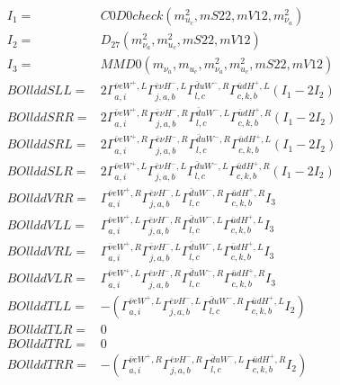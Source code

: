 \documentclass[A4,landscape]{article}
\begin{document}
\begin{align} 
I_1 = & C0D0check(m^2_{u_{{c}}}, mS22, mV12, m^2_{\nu_{{a}}}) \\ 
I_2 = & D_{27}(m^2_{\nu_{{a}}}, m^2_{u_{{c}}}, mS22, mV12) \\ 
I_3 = & MMD0(m_{\nu_{{a}}}, m_{u_{{c}}}, m^2_{\nu_{{a}}}, m^2_{u_{{c}}}, mS22, mV12) \\ 
  BOllddSLL= & 2  \Gamma^{\bar{\nu}e W^+,L}_{a, i} \Gamma^{\bar{e}\nu H^- ,L}_{j, a, b} \Gamma^{\bar{d}u W^- ,R}_{l, c} \Gamma^{\bar{u}d H^+,L}_{c, k, b} (I_1 - 2 I_2) \\ 
  BOllddSRR= & 2  \Gamma^{\bar{\nu}e W^+,R}_{a, i} \Gamma^{\bar{e}\nu H^- ,R}_{j, a, b} \Gamma^{\bar{d}u W^- ,L}_{l, c} \Gamma^{\bar{u}d H^+,R}_{c, k, b} (I_1 - 2 I_2) \\ 
  BOllddSRL= & 2  \Gamma^{\bar{\nu}e W^+,R}_{a, i} \Gamma^{\bar{e}\nu H^- ,R}_{j, a, b} \Gamma^{\bar{d}u W^- ,R}_{l, c} \Gamma^{\bar{u}d H^+,L}_{c, k, b} (I_1 - 2 I_2) \\ 
  BOllddSLR= & 2  \Gamma^{\bar{\nu}e W^+,L}_{a, i} \Gamma^{\bar{e}\nu H^- ,L}_{j, a, b} \Gamma^{\bar{d}u W^- ,L}_{l, c} \Gamma^{\bar{u}d H^+,R}_{c, k, b} (I_1 - 2 I_2) \\ 
  BOllddVRR= &  \Gamma^{\bar{\nu}e W^+,R}_{a, i} \Gamma^{\bar{e}\nu H^- ,L}_{j, a, b} \Gamma^{\bar{d}u W^- ,R}_{l, c} \Gamma^{\bar{u}d H^+,R}_{c, k, b} I_3 \\ 
  BOllddVLL= &  \Gamma^{\bar{\nu}e W^+,L}_{a, i} \Gamma^{\bar{e}\nu H^- ,R}_{j, a, b} \Gamma^{\bar{d}u W^- ,L}_{l, c} \Gamma^{\bar{u}d H^+,L}_{c, k, b} I_3 \\ 
  BOllddVRL= &  \Gamma^{\bar{\nu}e W^+,R}_{a, i} \Gamma^{\bar{e}\nu H^- ,L}_{j, a, b} \Gamma^{\bar{d}u W^- ,L}_{l, c} \Gamma^{\bar{u}d H^+,L}_{c, k, b} I_3 \\ 
  BOllddVLR= &  \Gamma^{\bar{\nu}e W^+,L}_{a, i} \Gamma^{\bar{e}\nu H^- ,R}_{j, a, b} \Gamma^{\bar{d}u W^- ,R}_{l, c} \Gamma^{\bar{u}d H^+,R}_{c, k, b} I_3 \\ 
  BOllddTLL= & -( \Gamma^{\bar{\nu}e W^+,L}_{a, i} \Gamma^{\bar{e}\nu H^- ,L}_{j, a, b} \Gamma^{\bar{d}u W^- ,R}_{l, c} \Gamma^{\bar{u}d H^+,L}_{c, k, b} I_2) \\ 
  BOllddTLR= & 0 \\ 
  BOllddTRL= & 0 \\ 
  BOllddTRR= & -( \Gamma^{\bar{\nu}e W^+,R}_{a, i} \Gamma^{\bar{e}\nu H^- ,R}_{j, a, b} \Gamma^{\bar{d}u W^- ,L}_{l, c} \Gamma^{\bar{u}d H^+,R}_{c, k, b} I_2) \\ 
\end{align} 
\end{document}
